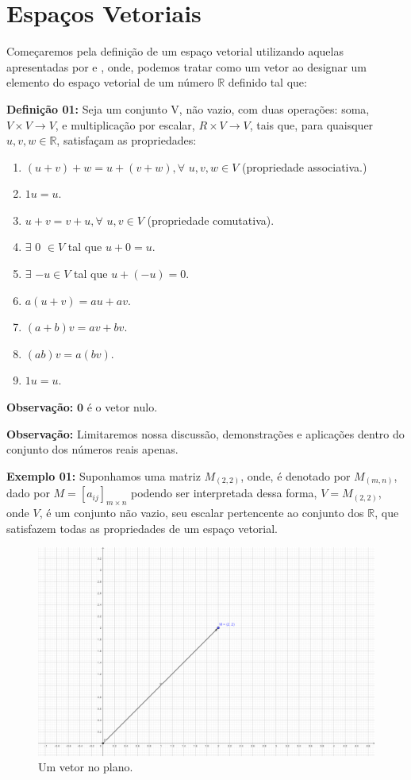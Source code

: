 \chapter{Espaços Vetoriais}
Começaremos pela definição de um espaço vetorial utilizando aquelas apresentadas por \cite{boldrini1980} e \cite{ulhoa2018}, onde, podemos tratar como um vetor ao designar um elemento do espaço vetorial de um número $\mathbb{R}$ definido tal que:

\noindent\textbf{Definição 01:} Seja um conjunto V, não vazio, com duas operações: soma, $V \times V \rightarrow V$, e multiplicação por escalar, $R \times V \rightarrow V$, tais que, para quaisquer $u, v, w \in \mathbb{R}$, satisfaçam as propriedades: \nocite{boldrini1980}

\begin{enumerate}
	\item $(u + v) + w = u + (v + w), \forall$ $u, v, w \in V$ (propriedade associativa.) 
	\item $1u = u$.
	\item $u + v = v + u, \forall$ $u, v \in V$ (propriedade comutativa).
	\item $\exists$ $0$ $\in V$ tal que $u + 0 = u$.
	\item $\exists$ $-u \in V$ tal que $u + (-u) = 0$.
	\item $a(u + v) = au + av$.
	\item $(a + b)v = av + bv$.
	\item $(ab)v = a(bv)$.
	\item $1u = u$.
\end{enumerate}

\noindent\textbf{Observação:} $\textbf{0}$ é o vetor nulo. \nocite{ulhoa2018}

\noindent\textbf{Observação:} Limitaremos nossa discussão, demonstrações e aplicações dentro do conjunto dos números reais apenas.

\noindent\textbf{Exemplo 01:} Suponhamos uma matriz $M_{(2, 2)}$, onde, é denotado por $M_{(m,n)}$, dado por $M = [a_{ij}]_{m \times n}$ podendo ser interpretada dessa forma, $V = M_{(2, 2)}$, onde $V$, é um conjunto não vazio, seu escalar pertencente ao conjunto dos $\mathbb{R}$, que satisfazem todas as propriedades de um espaço vetorial.

\begin{figure}[H]
	\centering
	\includegraphics[scale=2.00]{exemplo01.png}
	\caption{Um vetor no plano.}
\end{figure}

